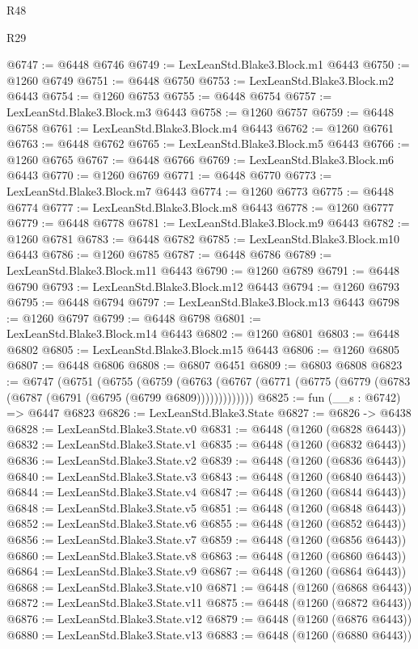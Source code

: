 \begin{lexlean}{R48}
\begin{lexlean}{R29}
\begin{coremodule}
{{{{{{{{{{{{{{{{{{{{{{{{{{{{{{{{{{{{{{{{{{{{{{{{{{{{{{{{{{{{{{{{{{{{{{{{{{{{{{{{{{{{{{{{{{{{{{{{{{{{{{{{{{{{{{{{{{{{{{{{{{{{{{{{{{{{{{{{{{{{{{{{{{{{{{{{{{{{{{{{{{{{{{{{{{{{{{{{{{{{{{{{{{{{{{{{{{{{{{{{{{{{{{{{{{{{{{{{{{@6747 := @6448 @6746
@6749 := LexLeanStd.Blake3.Block.m1 @6443
@6750 := @1260 @6749
@6751 := @6448 @6750
@6753 := LexLeanStd.Blake3.Block.m2 @6443
@6754 := @1260 @6753
@6755 := @6448 @6754
@6757 := LexLeanStd.Blake3.Block.m3 @6443
@6758 := @1260 @6757
@6759 := @6448 @6758
@6761 := LexLeanStd.Blake3.Block.m4 @6443
@6762 := @1260 @6761
@6763 := @6448 @6762
@6765 := LexLeanStd.Blake3.Block.m5 @6443
@6766 := @1260 @6765
@6767 := @6448 @6766
@6769 := LexLeanStd.Blake3.Block.m6 @6443
@6770 := @1260 @6769
@6771 := @6448 @6770
@6773 := LexLeanStd.Blake3.Block.m7 @6443
@6774 := @1260 @6773
@6775 := @6448 @6774
@6777 := LexLeanStd.Blake3.Block.m8 @6443
@6778 := @1260 @6777
@6779 := @6448 @6778
@6781 := LexLeanStd.Blake3.Block.m9 @6443
@6782 := @1260 @6781
@6783 := @6448 @6782
@6785 := LexLeanStd.Blake3.Block.m10 @6443
@6786 := @1260 @6785
@6787 := @6448 @6786
@6789 := LexLeanStd.Blake3.Block.m11 @6443
@6790 := @1260 @6789
@6791 := @6448 @6790
@6793 := LexLeanStd.Blake3.Block.m12 @6443
@6794 := @1260 @6793
@6795 := @6448 @6794
@6797 := LexLeanStd.Blake3.Block.m13 @6443
@6798 := @1260 @6797
@6799 := @6448 @6798
@6801 := LexLeanStd.Blake3.Block.m14 @6443
@6802 := @1260 @6801
@6803 := @6448 @6802
@6805 := LexLeanStd.Blake3.Block.m15 @6443
@6806 := @1260 @6805
@6807 := @6448 @6806
@6808 := @6807 @6451
@6809 := @6803 @6808
@6823 := @6747
    (@6751
      (@6755
        (@6759
          (@6763 (@6767 (@6771 (@6775 (@6779 (@6783 (@6787 (@6791 (@6795 (@6799 @6809)))))))))))))
@6825 := fun (__s : @6742) => @6447 @6823
@6826 := LexLeanStd.Blake3.State
@6827 := @6826 -> @6438
@6828 := LexLeanStd.Blake3.State.v0
@6831 := @6448 (@1260 (@6828 @6443))
@6832 := LexLeanStd.Blake3.State.v1
@6835 := @6448 (@1260 (@6832 @6443))
@6836 := LexLeanStd.Blake3.State.v2
@6839 := @6448 (@1260 (@6836 @6443))
@6840 := LexLeanStd.Blake3.State.v3
@6843 := @6448 (@1260 (@6840 @6443))
@6844 := LexLeanStd.Blake3.State.v4
@6847 := @6448 (@1260 (@6844 @6443))
@6848 := LexLeanStd.Blake3.State.v5
@6851 := @6448 (@1260 (@6848 @6443))
@6852 := LexLeanStd.Blake3.State.v6
@6855 := @6448 (@1260 (@6852 @6443))
@6856 := LexLeanStd.Blake3.State.v7
@6859 := @6448 (@1260 (@6856 @6443))
@6860 := LexLeanStd.Blake3.State.v8
@6863 := @6448 (@1260 (@6860 @6443))
@6864 := LexLeanStd.Blake3.State.v9
@6867 := @6448 (@1260 (@6864 @6443))
@6868 := LexLeanStd.Blake3.State.v10
@6871 := @6448 (@1260 (@6868 @6443))
@6872 := LexLeanStd.Blake3.State.v11
@6875 := @6448 (@1260 (@6872 @6443))
@6876 := LexLeanStd.Blake3.State.v12
@6879 := @6448 (@1260 (@6876 @6443))
@6880 := LexLeanStd.Blake3.State.v13
@6883 := @6448 (@1260 (@6880 @6443))
}}}}}}}}}}}}}}}}}}}}}}}}}}}}}}}}}}}}}}}}}}}}}}}}}}}}}}}}}}}}}}}}}}}}}}}}}}}}}}}}}}}}}}}}}}}}}}}}}}}}}}}}}}}}}}}}}}}}}}}}}}}}}}}}}}}}}}}}}}}}}}}}}}}}}}}}}}}}}}}}}}}}}}}}}}}}}}}}}}}}}}}}}}}}}}}}}}}}}}}}}}}}}}}}}}}}}}}}}}
\end{coremodule}
\end{lexlean}
\end{lexlean}
